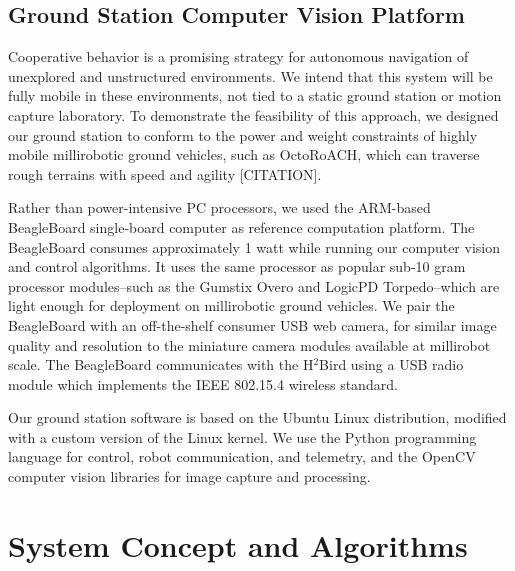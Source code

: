 \documentclass{aamas2013}
\begin{document}
\subsection{Ground Station Computer Vision Platform}
Cooperative behavior is a promising strategy for autonomous navigation of 
unexplored and unstructured environments. We intend that this system will be 
fully mobile in these environments, not tied to a static ground station or 
motion capture laboratory. To demonstrate the feasibility of this approach, 
we designed our ground station to conform to the power and weight 
constraints of highly mobile millirobotic ground vehicles, such as 
OctoRoACH, which can traverse rough terrains with speed and agility [CITATION]. 

Rather than power-intensive PC processors, we used the ARM-based 
BeagleBoard single-board computer as reference computation platform. The
BeagleBoard consumes approximately 1 watt while running our computer vision 
and control algorithms. It uses the same processor as popular sub-10 gram 
processor modules--such as the Gumstix Overo and LogicPD Torpedo--which are 
light enough for deployment on millirobotic ground vehicles. We pair the 
BeagleBoard with an off-the-shelf consumer USB web camera, for similar image 
quality and resolution to the miniature camera modules available at 
millirobot scale. The BeagleBoard communicates with the H$^2$Bird using a 
USB radio module which implements the IEEE 802.15.4 wireless standard.

Our ground station software is based on the Ubuntu Linux distribution, 
modified with a custom version of the Linux kernel. We use the Python 
programming language for control, robot communication, and telemetry, and 
the OpenCV computer vision libraries for image capture and processing.
\section{System Concept and Algorithms}
\end{document}
